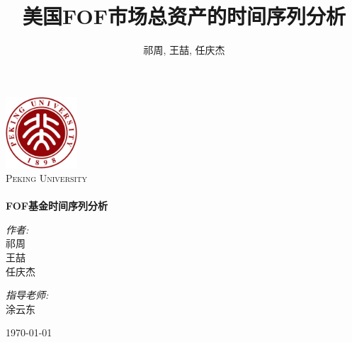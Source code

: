 \documentclass[10.5pt,onecolumn,a4paper]{article}%
\title{美国FOF市场总资产的时间序列分析}
\author{祁周, 王喆, 任庆杰}
\begin{document}
\begin{titlepage}	
	\begin{center}	
		\includegraphics[width=0.2\textwidth]{./pkulogo}\\[1cm]    
		
		\textsc{\LARGE Peking University}\\[1.5cm]
		
		\textsc{\Large }\\[2cm]
		
		

		{ \huge \bfseries FOF基金时间序列分析}\\[3cm]

		
		\begin{minipage}{0.4\textwidth}
			\begin{flushleft} \large
				\emph{\Large 作者:}\\
				\Large 祁周\\
				\Large 王喆\\
				\Large 任庆杰
			\end{flushleft}
		\end{minipage}
		\begin{minipage}{0.4\textwidth}
			\begin{flushright} \large
				\emph{\Large 指导老师:} \\
		\Large 涂云东
			\end{flushright}
		\end{minipage}
		
		\vfill
		
		{\large \today}
		
	\end{center}
	
\end{titlepage}







\clearpage












\clearpage



\appendix


\end{document}
